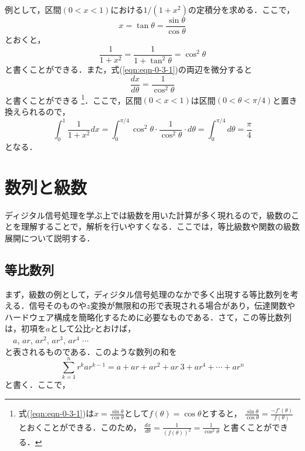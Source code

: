例として，区間$(0<x<1)$における$1/(1+x^2)$の定積分を求める．ここで，
\begin{equation}
x=\tan\theta=\frac{\sin \theta}{\cos \theta}
\label{eqn:eqn-0-3-1}
\end{equation}
とおくと，
\begin{equation}
\frac{1}{1+x^2}=\frac{1}{1+\tan ^2 \theta}=\cos ^2 \theta
\end{equation}
と書くことができる．また，式(\ref{eqn:eqn-0-3-1})の両辺を微分すると
\begin{equation}
\frac{dx}{d\theta}=\frac{1}{\cos ^2 \theta}
\end{equation}
と書くことができる
\footnote{式(\ref{eqn:eqn-0-3-1})は$\displaystyle x=\frac{\sin \theta}{\cos \theta}$として$f(\theta)=\cos \theta$とすると，
$\displaystyle \frac{\sin \theta}{\cos \theta}=\frac{-f'(\theta)}{f(\theta)}$とおくことができる．このため，
$\displaystyle \frac{dx}{d\theta}=\frac{1}{(f(\theta))^2}=\frac{1}{\cos^2 \theta}$
と書くことができる．
}．ここで，区間$(0<x<1)$は区間$(0< \theta <\pi /4)$と置き換えられるので，
\begin{equation}
\int_{0}^{1} \frac{1}{1+x^2}dx= \int_{0}^{\pi /4} \cos^2 \theta \cdot \frac{1}{\cos^2 \theta} \cdot d\theta %
 = \int_{0}^{\pi /4} d\theta %
 = \frac{\pi}{4}
\end{equation}
となる．



\section{数列と級数}

ディジタル信号処理を学ぶ上では級数を用いた計算が多く現れるので，級数のことを理解することで，解析を行いやすくなる．ここでは，等比級数や関数の級数展開について説明する．

\subsection{等比数列}

まず，級数の例として，ディジタル信号処理のなかで多く出現する等比数列を考える．信号そのものや$z$変換が無限和の形で表現される場合があり，伝達関数やハードウェア構成を簡略化するために必要なものである．さて，この等比数列は，初項を$a$として公比$r$とおけば，\\
　$a$, $ar$, $ar^2$, $ar^3$, $ar^4$ $\cdots$\\
と表されるものである．このような数列の和を
\begin{equation}
\sum_{k=1}^{n}r^{k} ar^{k-1}= a + ar + ar^2 + ar~3 + ar^4 + \cdots + ar^n
\end{equation}
と書く．ここで，

